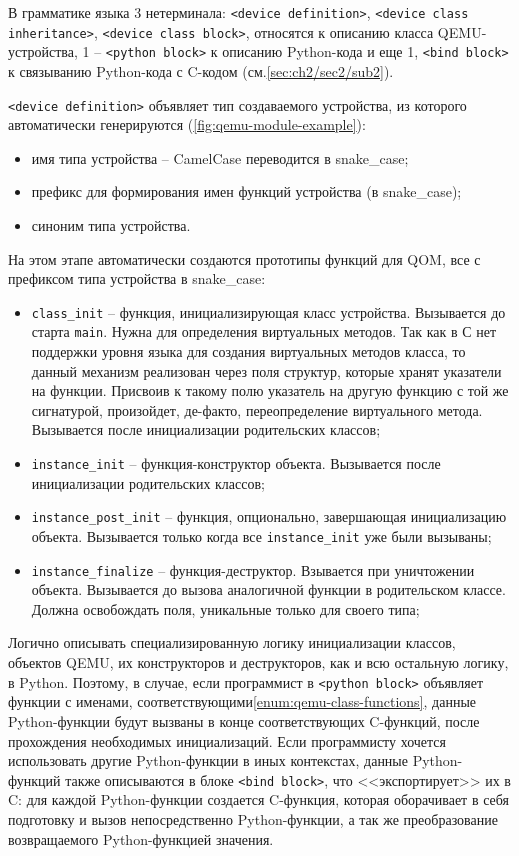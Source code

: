 В грамматике языка {\mylanguage} 3 нетерминала:
\texttt{<device definition>}, \texttt{<device class inheritance>}, \texttt{<device class block>},
относятся к описанию класса QEMU-устройства, 1 -- \texttt{<python block>} к описанию Python-кода
и еще 1, \texttt{<bind block>} к связыванию Python-кода с C-кодом (см.\cref{sec:ch2/sec2/sub2}).

\texttt{<device definition>} объявляет тип создаваемого устройства, из которого автоматически
генерируются (\cref{fig:qemu-module-example}):
\begin{itemize}
    \item имя типа устройства -- CamelCase переводится в snake\_case;
    \item префикс для формирования имен функций устройства (в snake\_case);
    \item синоним типа устройства.
\end{itemize}

На этом этапе автоматически создаются прототипы функций для QOM, все
с префиксом типа устройства в snake\_case:
\begin{itemize}
    \item \texttt{class\_init} -- функция, инициализирующая класс устройства.
        Вызывается до старта \texttt{main}. Нужна для определения виртуальных методов.
        Так как в С нет поддержки уровня языка для создания виртуальных методов
        класса, то данный механизм реализован через поля структур, которые хранят
        указатели на функции. Присвоив к такому полю указатель на другую функцию
        с той же сигнатурой, произойдет, де-факто, переопределение виртуального метода.
        Вызывается после инициализации родительских классов;
    \item \texttt{instance\_init} -- функция-конструктор объекта. Вызывается после
        инициализации родительских классов;
    \item \texttt{instance\_post\_init} -- функция, опционально, завершающая инициализацию
        объекта. Вызывается только когда все \texttt{instance\_init} уже были вызываны;
    \item \texttt{instance\_finalize} -- функция-деструктор. Взывается при уничтожении
        объекта. Вызывается до вызова аналогичной функции в родительском классе.
        Должна освобождать поля, уникальные только для своего типа;
\end{itemize}\label{enum:qemu-class-functions}

Логично описывать специализированную логику инициализации классов,
объектов QEMU, их конструкторов и деструкторов, как и всю остальную логику, в Python.
Поэтому, в случае, если программист в \texttt{<python block>} объявляет функции с именами,
соответствующими\cref{enum:qemu-class-functions}, данные Python-функции будут вызваны
в конце соответствующих C-функций, после прохождения необходимых инициализаций.
Если программисту хочется использовать другие Python-функции в иных контекстах,
данные Python-функций также описываются в блоке \texttt{<bind block>},
что <<экспортирует>> их в C: для каждой Python-функции создается C-функция,
которая оборачивает в себя подготовку и вызов непосредственно Python-функции, а так же
преобразование возвращаемого Python-функцией значения.


